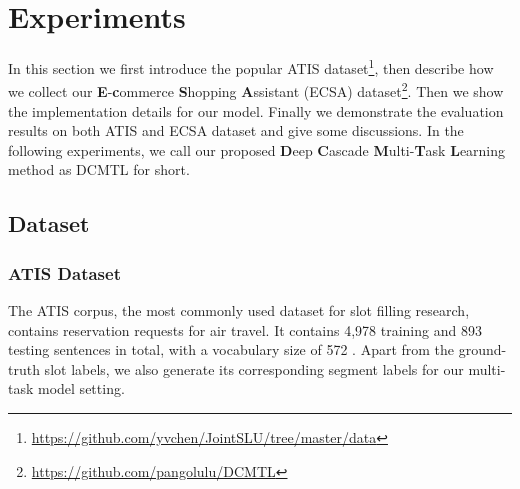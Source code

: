 \section{Experiments}
\label{sec:exp}
In this section we first introduce the popular ATIS dataset\footnote{ \url{https://github.com/yvchen/JointSLU/tree/master/data}},
then describe how we collect our \textbf{E}-\textbf{c}ommerce \textbf{S}hopping \textbf{A}ssistant (ECSA) dataset\footnote{ \url{https://github.com/pangolulu/DCMTL}}.
Then we show the implementation details for our model.
Finally we demonstrate the evaluation results on both ATIS and ECSA dataset and give some discussions.
In the following experiments, we call our proposed \textbf{D}eep \textbf{C}ascade \textbf{M}ulti-\textbf{T}ask \textbf{L}earning method as DCMTL for short.

\subsection{Dataset}
\label{sec:data}
\subsubsection{ATIS Dataset}
The ATIS corpus, the most commonly used dataset for slot filling research, contains reservation requests for air travel.
It contains 4,978 training and 893 testing sentences in total, with a vocabulary size of 572 \cite{mesnil2015using}. 
Apart from the ground-truth slot labels, we also generate its 
corresponding segment labels for our multi-task model setting.

